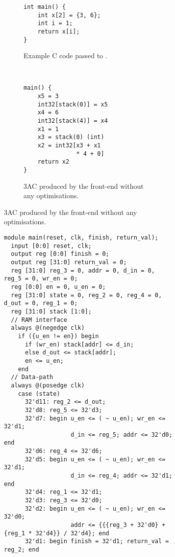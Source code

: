 \begin{figure}
  \centering
  \begin{subfigure}[b]{0.3\linewidth}
    \begin{subfigure}[t]{1\linewidth}
\begin{verbatim}
int main() {
    int x[2] = {3, 6};
    int i = 1;
    return x[i];
}
\end{verbatim}
      \caption{Example C code passed to \vericert{}.}\label{fig:accumulator_c}
    \end{subfigure}\\\vspace{3em}
    \begin{subfigure}[b]{1\linewidth}
\begin{verbatim}
main() {
    x5 = 3
    int32[stack(0)] = x5
    x4 = 6
    int32[stack(4)] = x4
    x1 = 1
    x3 = stack(0) (int)
    x2 = int32[x3 + x1
               * 4 + 0]
    return x2
}
\end{verbatim}
      \caption{3AC produced by the \compcert{} front-end without any optimisations.}\label{fig:accumulator_rtl}
    \end{subfigure}
  \end{subfigure}\hfill%
  \begin{subfigure}[b]{0.65\linewidth}
\begin{verbatim}
module main(reset, clk, finish, return_val);
  input [0:0] reset, clk;
  output reg [0:0] finish = 0;
  output reg [31:0] return_val = 0;
  reg [31:0] reg_3 = 0, addr = 0, d_in = 0, reg_5 = 0, wr_en = 0;
  reg [0:0] en = 0, u_en = 0;
  reg [31:0] state = 0, reg_2 = 0, reg_4 = 0, d_out = 0, reg_1 = 0;
  reg [31:0] stack [1:0];
  // RAM interface
  always @(negedge clk)
    if ({u_en != en}) begin
      if (wr_en) stack[addr] <= d_in;
      else d_out <= stack[addr];
      en <= u_en;
    end
  // Data-path
  always @(posedge clk)
    case (state)
      32'd11: reg_2 <= d_out;
      32'd8: reg_5 <= 32'd3;
      32'd7: begin u_en <= ( ~ u_en); wr_en <= 32'd1;
                   d_in <= reg_5; addr <= 32'd0; end
      32'd6: reg_4 <= 32'd6;
      32'd5: begin u_en <= ( ~ u_en); wr_en <= 32'd1;
                   d_in <= reg_4; addr <= 32'd1; end
      32'd4: reg_1 <= 32'd1;
      32'd3: reg_3 <= 32'd0;
      32'd2: begin u_en <= ( ~ u_en); wr_en <= 32'd0;
                   addr <= {{{reg_3 + 32'd0} + {reg_1 * 32'd4}} / 32'd4}; end
      32'd1: begin finish = 32'd1; return_val = reg_2; end

\end{verbatim}
\end{subfigure}
\end{figure}
